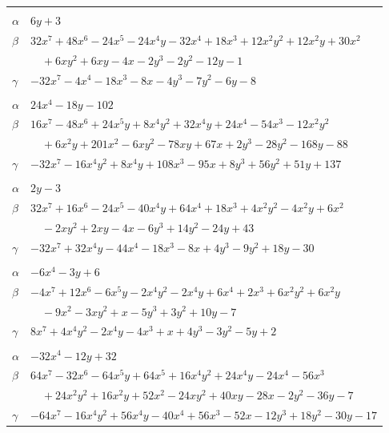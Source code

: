 \documentclass[11pt]{article}
\begin{document}
\begin{longtable}{@{}ll@{}}
\addlinespace[3pt]
\multicolumn{2}{@{}l}{$\{i,j\}=\{55,81\}$, $k_{ij}=2\cdot 3^{2}$}\\
$\alpha$ & $6y+3$\\
$\beta$ & $32x^{7}+48x^{6}-24x^{5}-24x^{4}y-32x^{4}+18x^{3}+12x^{2}y^{2}+12x^{2}y+30x^{2}$\\
 & $\quad +6xy^{2}+6xy-4x-2y^{3}-2y^{2}-12y-1$\\
$\gamma$ & $-32x^{7}-4x^{4}-18x^{3}-8x-4y^{3}-7y^{2}-6y-8$\\
\addlinespace[3pt]
\multicolumn{2}{@{}l}{$\{i,j\}=\{55,104\}$, $k_{ij}=2^{2}\cdot 3\cdot 7$}\\
$\alpha$ & $24x^{4}-18y-102$\\
$\beta$ & $16x^{7}-48x^{6}+24x^{5}y+8x^{4}y^{2}+32x^{4}y+24x^{4}-54x^{3}-12x^{2}y^{2}$\\
 & $\quad +6x^{2}y+201x^{2}-6xy^{2}-78xy+67x+2y^{3}-28y^{2}-168y-88$\\
$\gamma$ & $-32x^{7}-16x^{4}y^{2}+8x^{4}y+108x^{3}-95x+8y^{3}+56y^{2}+51y+137$\\
\addlinespace[3pt]
\multicolumn{2}{@{}l}{$\{i,j\}=\{56,81\}$, $k_{ij}=2\cdot 7$}\\
$\alpha$ & $2y-3$\\
$\beta$ & $32x^{7}+16x^{6}-24x^{5}-40x^{4}y+64x^{4}+18x^{3}+4x^{2}y^{2}-4x^{2}y+6x^{2}$\\
 & $\quad -2xy^{2}+2xy-4x-6y^{3}+14y^{2}-24y+43$\\
$\gamma$ & $-32x^{7}+32x^{4}y-44x^{4}-18x^{3}-8x+4y^{3}-9y^{2}+18y-30$\\
\addlinespace[3pt]
\multicolumn{2}{@{}l}{$\{i,j\}=\{56,108\}$, $k_{ij}=3^{2}$}\\
$\alpha$ & $-6x^{4}-3y+6$\\
$\beta$ & $-4x^{7}+12x^{6}-6x^{5}y-2x^{4}y^{2}-2x^{4}y+6x^{4}+2x^{3}+6x^{2}y^{2}+6x^{2}y$\\
 & $\quad -9x^{2}-3xy^{2}+x-5y^{3}+3y^{2}+10y-7$\\
$\gamma$ & $8x^{7}+4x^{4}y^{2}-2x^{4}y-4x^{3}+x+4y^{3}-3y^{2}-5y+2$\\
\addlinespace[3pt]
\multicolumn{2}{@{}l}{$\{i,j\}=\{58,62\}$, $k_{ij}=3\cdot 5$}\\
$\alpha$ & $-32x^{4}-12y+32$\\
$\beta$ & $64x^{7}-32x^{6}-64x^{5}y+64x^{5}+16x^{4}y^{2}+24x^{4}y-24x^{4}-56x^{3}$\\
 & $\quad +24x^{2}y^{2}+16x^{2}y+52x^{2}-24xy^{2}+40xy-28x-2y^{2}-36y-7$\\
$\gamma$ & $-64x^{7}-16x^{4}y^{2}+56x^{4}y-40x^{4}+56x^{3}-52x-12y^{3}+18y^{2}-30y-17$\\

\end{longtable}
\end{document}
